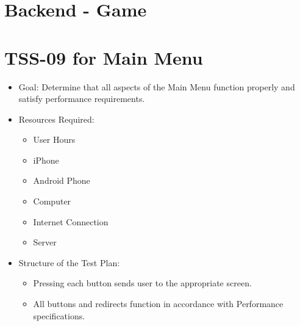 \section{Backend - Game}


\section{TSS-09 for Main Menu}
\begin{itemize}
\item Goal: Determine that all aspects of the Main Menu function properly and satisfy
performance requirements.
\item Resources Required: 

\begin{itemize}
\item User Hours 
\item iPhone 
\item Android Phone 
\item Computer 
\item Internet Connection 
\item Server
\end{itemize}
\item Structure of the Test Plan: 

\begin{itemize}

\item Pressing each button sends user to the appropriate screen.
\item All buttons and redirects function in accordance with Performance specifications.

\end{itemize}
\end{itemize}

